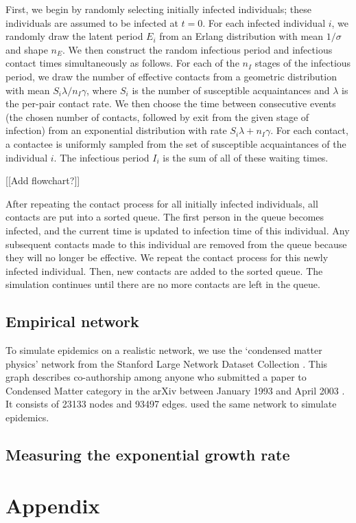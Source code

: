 \documentclass[12pt]{article}
\begin{document}
First, we begin by randomly selecting initially infected individuals; these individuals are assumed to be infected at $t = 0$.
For each infected individual $i$, we randomly draw the latent period $E_i$ from an Erlang distribution with mean $1/\sigma$ and shape $n_E$.
We then construct the random infectious period and infectious contact times simultaneously as follows.
For each of the $n_I$ stages of the infectious period, we draw the number of effective contacts from a geometric distribution with mean $S_i \lambda / n_I\gamma$, where $S_i$ is the number
of susceptible acquaintances and $\lambda$ is the per-pair contact rate.
We then choose the time between consecutive events (the chosen number of contacts, followed by exit from the given stage of infection) from an exponential distribution with rate $S_i \lambda + n_I\gamma$.
For each contact, a contactee is uniformly sampled from the set of susceptible acquaintances of the individual $i$.
The infectious period $I_i$ is the sum of all of these waiting times.

[[Add flowchart?]]

After repeating the contact process for all initially infected individuals, all contacts are put into a sorted queue.
The first person in the queue becomes infected, and the current time is updated to infection time of this individual. 
Any subsequent contacts made to this individual are removed from the queue because they will no longer be effective.
We repeat the contact process for this newly infected individual.
Then, new contacts are added to the sorted queue.
The simulation continues until there are no more contacts are left in the queue.

\subsection{Empirical network}

To simulate epidemics on a realistic network, we use the `condensed matter physics' network from the Stanford Large Network Dataset Collection \citep{leskovec2016snap}.
This graph describes co-authorship among anyone who submitted a paper to Condensed Matter category in the arXiv between January 1993 and April 2003 \citep{leskovec2007graph}.
It consists of 23133 nodes and 93497 edges.
\cite{trapman2016inferring} used the same network to simulate epidemics.

\subsection{Measuring the exponential growth rate}



\section{Appendix}


\end{document}
